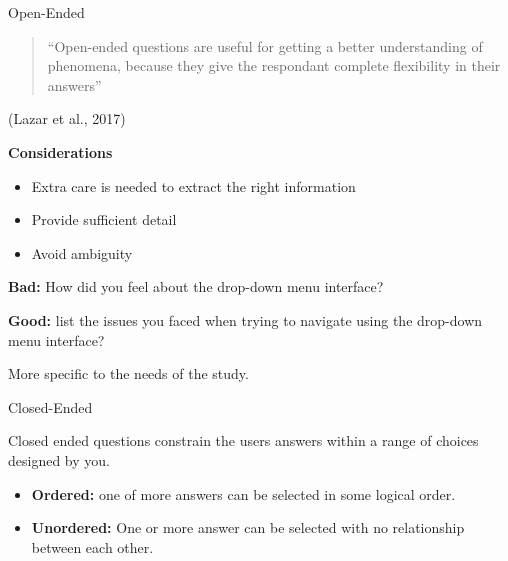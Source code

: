\documentclass[ignorenonframetext,]{beamer}
\providecommand{\tightlist}{%
  \setlength{\itemsep}{0pt}\setlength{\parskip}{0pt}}
\begin{document}
\begin{frame}{Open-Ended}

\begin{quote}
``Open-ended questions are useful for getting a better understanding of
phenomena, because they give the respondant complete flexibility in
their answers''
\end{quote}

(Lazar et al., 2017)

\textbf{Considerations}

\begin{itemize}
\tightlist
\item
  Extra care is needed to extract the right information
\item
  Provide sufficient detail
\item
  Avoid ambiguity
\end{itemize}

\end{frame}

\begin{frame}

\textbf{Bad:} How did you feel about the drop-down menu interface?

\textbf{Good:} list the issues you faced when trying to navigate using
the drop-down menu interface?

More specific to the needs of the study.

\end{frame}

\begin{frame}{Closed-Ended}

Closed ended questions constrain the users answers within a range of
choices designed by you.

\begin{itemize}
\tightlist
\item
  \textbf{Ordered:} one of more answers can be selected in some logical
  order.
\item
  \textbf{Unordered:} One or more answer can be selected with no
  relationship between each other.
\end{itemize}

\end{frame}
\end{document}
